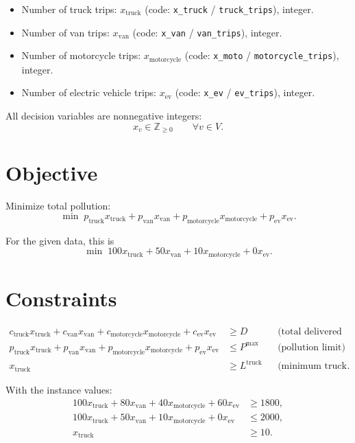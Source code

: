 \begin{itemize}
    \item Number of truck trips: \(x_{\text{truck}}\) (code: \texttt{x\_truck} / \texttt{truck\_trips}), integer.
    \item Number of van trips: \(x_{\text{van}}\) (code: \texttt{x\_van} / \texttt{van\_trips}), integer.
    \item Number of motorcycle trips: \(x_{\text{motorcycle}}\) (code: \texttt{x\_moto} / \texttt{motorcycle\_trips}), integer.
    \item Number of electric vehicle trips: \(x_{\text{ev}}\) (code: \texttt{x\_ev} / \texttt{ev\_trips}), integer.
\end{itemize}

All decision variables are nonnegative integers:
\[
x_v \in \mathbb{Z}_{\ge 0}\qquad \forall v \in V.
\]

\section*{Objective}

Minimize total pollution:
\[
\min \;
p_{\text{truck}}x_{\text{truck}}
+p_{\text{van}}x_{\text{van}}
+p_{\text{motorcycle}}x_{\text{motorcycle}}
+p_{\text{ev}}x_{\text{ev}}.
\]

For the given data, this is
\[
\min \; 100x_{\text{truck}} + 50x_{\text{van}} + 10x_{\text{motorcycle}} + 0x_{\text{ev}}.
\]

\section*{Constraints}

\begin{align*}
c_{\text{truck}}x_{\text{truck}}
+c_{\text{van}}x_{\text{van}}
+c_{\text{motorcycle}}x_{\text{motorcycle}}
+c_{\text{ev}}x_{\text{ev}}
&\ge D
&&\text{(total delivered capacity)}\\[4pt]
p_{\text{truck}}x_{\text{truck}}
+p_{\text{van}}x_{\text{van}}
+p_{\text{motorcycle}}x_{\text{motorcycle}}
+p_{\text{ev}}x_{\text{ev}}
&\le P^{\max}
&&\text{(pollution limit)}\\[4pt]
x_{\text{truck}} &\ge L^{\text{truck}}
&&\text{(minimum truck trips)}.
\end{align*}

With the instance values:
\begin{align*}
100x_{\text{truck}} + 80x_{\text{van}} + 40x_{\text{motorcycle}} + 60x_{\text{ev}} &\ge 1800,\\
100x_{\text{truck}} + 50x_{\text{van}} + 10x_{\text{motorcycle}} + 0x_{\text{ev}} &\le 2000,\\
x_{\text{truck}} &\ge 10.
\end{align*}

